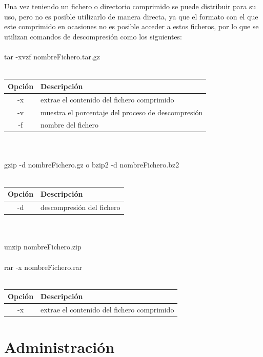 \documentclass[10pt,a4paper,titlepage]{article}
\begin{document}
	\\
	\\
	Una vez teniendo un fichero o directorio comprimido se puede distribuir para su uso, pero no es posible utilizarlo de manera directa, ya que el formato con el que este comprimido en ocasiones no es posible acceder a estos ficheros, por lo que se utilizan comandos de descompresión como los siguientes:
	\\
	\\
	tar -xvzf nombreFichero.tar.gz
	\\
	\\
	\begin{tabular}{|c|p{8cm}|}
		\hline
		Opción & Descripción \\
		\hline
		-x & extrae el contenido del fichero comprimido \\
		\hline
		-v & muestra el porcentaje del proceso de descompresión \\
		\hline
		-f & nombre del fichero \\
		\hline
	\end{tabular}
	\\
	\\
	gzip -d nombreFichero.gz o bzip2 -d nombreFichero.bz2
	\\
	\\
	\begin{tabular}{|c|p{8cm}|}
		\hline
		Opción & Descripción \\
		\hline
		-d & descompresión del fichero \\
		\hline
	\end{tabular}
	\\
	\\
	unzip nombreFichero.zip
	\\
	\\
	rar -x nombreFichero.rar
	\\
	\\
	\begin{tabular}{|c|p{8cm}|}
		\hline
		Opción & Descripción \\
		\hline
		-x & extrae el contenido del fichero comprimido \\
		\hline
	\end{tabular}
	
	\section*{Administración}
	
\end{document}

